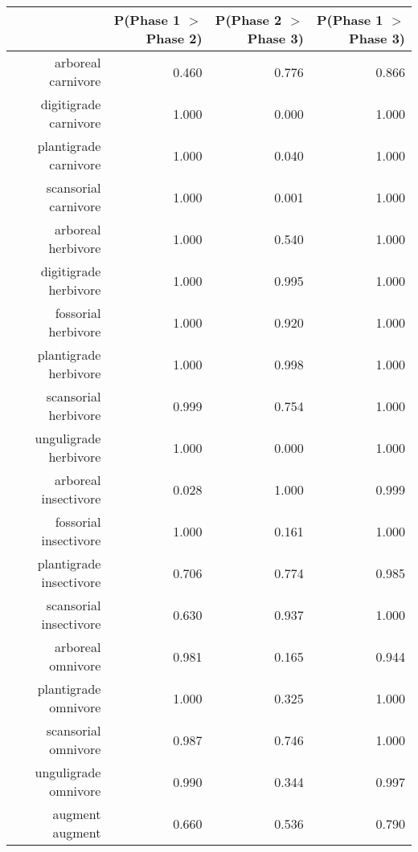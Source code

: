 \begin{table}[ht]
\centering
\begin{tabular}{rrrr}
  \hline
 & P(Phase 1 $>$ Phase 2) & P(Phase 2 $>$ Phase 3) & P(Phase 1 $>$ Phase 3) \\ 
  \hline
arboreal carnivore & 0.460 & 0.776 & 0.866 \\ 
  digitigrade carnivore & 1.000 & 0.000 & 1.000 \\ 
  plantigrade carnivore & 1.000 & 0.040 & 1.000 \\ 
  scansorial carnivore & 1.000 & 0.001 & 1.000 \\ 
  arboreal herbivore & 1.000 & 0.540 & 1.000 \\ 
  digitigrade herbivore & 1.000 & 0.995 & 1.000 \\ 
  fossorial herbivore & 1.000 & 0.920 & 1.000 \\ 
  plantigrade herbivore & 1.000 & 0.998 & 1.000 \\ 
  scansorial herbivore & 0.999 & 0.754 & 1.000 \\ 
  unguligrade herbivore & 1.000 & 0.000 & 1.000 \\ 
  arboreal insectivore & 0.028 & 1.000 & 0.999 \\ 
  fossorial insectivore & 1.000 & 0.161 & 1.000 \\ 
  plantigrade insectivore & 0.706 & 0.774 & 0.985 \\ 
  scansorial insectivore & 0.630 & 0.937 & 1.000 \\ 
  arboreal omnivore & 0.981 & 0.165 & 0.944 \\ 
  plantigrade omnivore & 1.000 & 0.325 & 1.000 \\ 
  scansorial omnivore & 0.987 & 0.746 & 1.000 \\ 
  unguligrade omnivore & 0.990 & 0.344 & 0.997 \\ 
  augment augment & 0.660 & 0.536 & 0.790 \\ 
   \hline
\end{tabular}
\label{tab:occur_plant}
\end{table}
